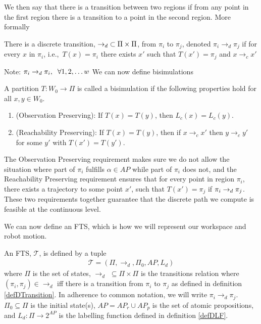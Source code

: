 We then say that there is a transition between two regions if from any point in the first region there is a transition to a point in the second region. More formally

\theoremstyle{definition}
\begin{definition}
\label{defDTransition}
There is a discrete transition, $\rightarrow_d \hspace{0.1cm} \subset \Pi \times \Pi$, from $\pi_i$ to $\pi_j$, denoted $\pi_i \rightarrow_d \pi_j$ if for every $x$ in $\pi_i$, i.e.,\ $T(x) = \pi_i$ there exists $x'$ such that $T(x')=\pi_j$ and $x \rightarrow_c x'$
\end{definition}
Note: $\pi_i \rightarrow_d \pi_i, \hspace{0.2cm} \forall 1,2,\dots w$
We can now define bisimulations
\theoremstyle{definition}
\begin{definition}
\label{def:bisim}
A partition $T:W_0\rightarrow \Pi$ is called a bisimulation \cite{fainekos09} if the following properties hold for all $x,y \in W_0$.
\begin{enumerate}
    \item (Observation Preserving): If $T(x)=T(y)$, then $L_c(x) = L_c(y)$.
    \item (Reachability Preserving): If $T(x) = T(y)$, then if $x\rightarrow_c x'$ then $y \rightarrow_c y'$ for some $y'$ with $T(x')=T(y')$.
\end{enumerate}
\end{definition}

The Observation Preserving requirement makes sure we do not allow the situation where part of $\pi_i$ fulfills $\alpha \in AP$ while part of $\pi_i$ does not, and the Reachability Preserving requirement ensures that for every point in region $\pi_i$, there exists a trajectory to some point $x'$, such that $T(x') = \pi_j$ if $\pi_i \nobreak \rightarrow_d \pi_j$. These two requirements together guarantee that the discrete path we compute is feasible at the continuous level.


We can now define an FTS, which is how we will represent our workspace and robot motion.
\theoremstyle{definition}
\begin{definition}
\label{defFTS}
An FTS, $\mathcal{T}$, is defined by a tuple 
\begin{align*}
\mathcal{T} = (\Pi, \rightarrow_d, \Pi_0, AP,L_d)
\end{align*}
where $\Pi$ is the set of states, $\rightarrow_d$ $ \subseteq \Pi \times \Pi$ is the transitions relation where $(\pi_i,\pi_j) \in \rightarrow_d$ iff there is a transition from $\pi_i$ to $\pi_j$ as defined in definition \ref{defDTransition}. In adherence to common notation, we will write $\pi_i \rightarrow_d \pi_j$. $\Pi_0 \subseteq \Pi$ is the initial state(s), $AP=AP_r \cup AP_p$ is the set of atomic propositions, and $L_d: \Pi \rightarrow 2^{AP}$ is the labelling function defined in definition \ref{defDLF}.
\end{definition}


